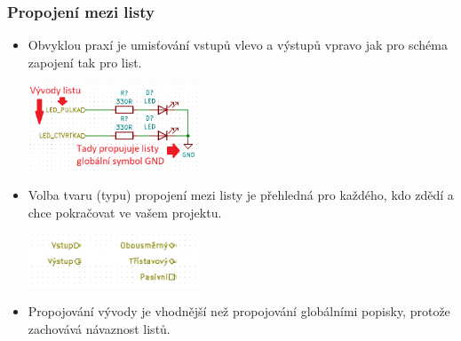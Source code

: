 \documentclass{beamer}
\begin{document}
\begin{frame}
	\frametitle{Propojení mezi listy}
	\small
	\begin{itemize}
		\item Obvyklou praxí je umisťování vstupů vlevo a výstupů vpravo jak pro schéma zapojení tak pro list.
			\begin{center}
				\includegraphics[width=0.4\textwidth]{obr/dalsi_strana07.png}
			\end{center}
		\item Volba tvaru (typu) propojení mezi listy je přehledná pro každého, kdo zdědí a chce pokračovat ve vašem projektu.
			\begin{center}
				\includegraphics[width=0.4\textwidth]{obr/dalsi_strana08.png}
			\end{center}
		\item Propojování vývody je vhodnější než propojování globálními popisky, protože zachovává návaznost listů.
	\end{itemize}
	
\end{frame}
\end{document}
